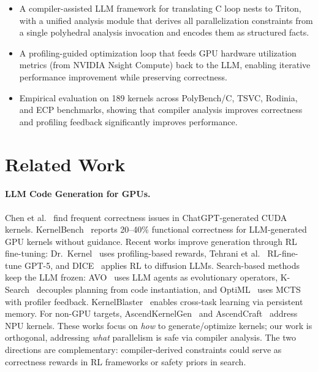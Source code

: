 \documentclass[sigconf]{acmart}
\begin{document}
\begin{itemize}
\item A compiler-assisted LLM framework for translating C loop nests to Triton, with a unified analysis module that derives all parallelization constraints from a single polyhedral analysis invocation and encodes them as structured facts.
\item A profiling-guided optimization loop that feeds GPU hardware utilization metrics (from NVIDIA Nsight Compute) back to the LLM, enabling iterative performance improvement while preserving correctness.
\item Empirical evaluation on 189 kernels across PolyBench/C, TSVC, Rodinia, and ECP benchmarks, showing that compiler analysis improves correctness and profiling feedback significantly improves performance.
\end{itemize}







\section{Related Work}
\label{sec:related}

\paragraph{LLM Code Generation for GPUs.}
Chen et al.~\cite{chen2024chatgpt} find frequent correctness issues in ChatGPT-generated CUDA kernels.
KernelBench~\cite{ouyang2024kernelbench} reports 20--40\% functional correctness for LLM-generated GPU kernels without guidance.
Recent works improve generation through RL fine-tuning: Dr.~Kernel~\cite{liu2026drkernel} uses profiling-based rewards, Tehrani et al.~\cite{tehrani2026ftgpt5} RL-fine-tune GPT-5, and DICE~\cite{bai2026dice} applies RL to diffusion LLMs.
Search-based methods keep the LLM frozen: AVO~\cite{chen2026avo} uses LLM agents as evolutionary operators, K-Search~\cite{cao2026ksearch} decouples planning from code instantiation, and OptiML~\cite{bhattacharjee2026optiml} uses MCTS with profiler feedback.
KernelBlaster~\cite{dong2026kernelblaster} enables cross-task learning via persistent memory.
For non-GPU targets, AscendKernelGen~\cite{cao2026ascendkernelgen} and AscendCraft~\cite{wen2026ascendcraft} address NPU kernels.
These works focus on \emph{how} to generate/optimize kernels; our work is orthogonal, addressing \emph{what} parallelism is safe via compiler analysis. The two directions are complementary: compiler-derived constraints could serve as correctness rewards in RL frameworks or safety priors in search.
\end{document}
